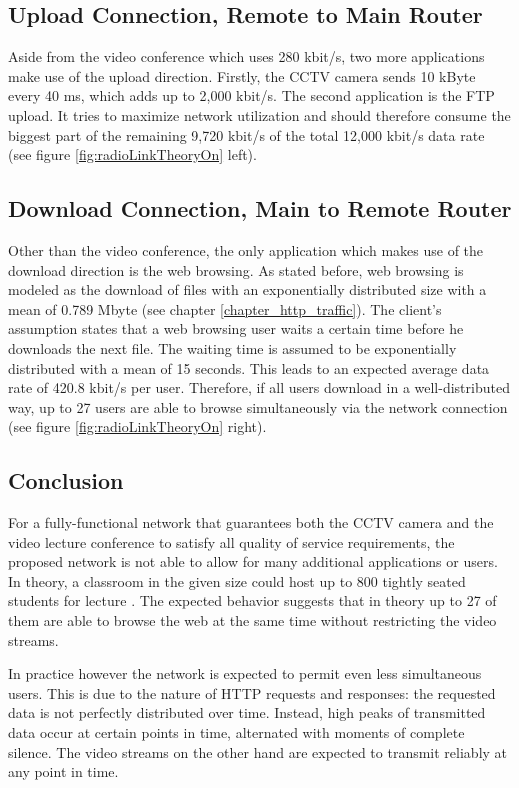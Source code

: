\documentclass[a4paper,10pt]{book}\usepackage{graphicx}
\begin{document}
\subsection{Upload Connection, Remote to Main Router}
Aside from the video conference which uses 280 kbit/s, two more applications make use of the upload direction. Firstly, the CCTV camera sends 10 kByte every 40 ms, which adds up to 2,000 kbit/s. The second application is the FTP upload. It tries to maximize network utilization and should therefore consume the biggest part of the remaining 9,720 kbit/s of the total 12,000 kbit/s data rate (see figure \ref{fig:radioLinkTheoryOn} left).

\subsection{Download Connection, Main to Remote Router}
Other than the video conference, the only application which makes use of the download direction is the web browsing. As stated before, web browsing is modeled as the download of files with an exponentially distributed size with a mean of 0.789 Mbyte (see chapter \ref{chapter_http_traffic}). The client's assumption states that a web browsing user waits a certain time before he downloads the next file. The waiting time is assumed to be exponentially distributed with a mean of 15 seconds. This leads to an expected average data rate of 420.8 kbit/s per user. Therefore, if all users download in a well-distributed way, up to 27 users are able to browse simultaneously via the network connection (see figure \ref{fig:radioLinkTheoryOn} right).

\subsection{Conclusion}
For a fully-functional network that guarantees both the CCTV camera and the video lecture conference to satisfy all quality of service requirements, the proposed network is not able to allow for many additional applications or users. In theory, a classroom in the given size could host up to 800 tightly seated students for lecture \cite{sitzkultur}. The expected behavior suggests that in theory up to 27 of them are able to browse the web at the same time without restricting the video streams. 

In practice however the network is expected to permit even less simultaneous users. This is due to the nature of HTTP requests and responses: the requested data is not perfectly distributed over time. Instead, high peaks of transmitted data occur at certain points in time, alternated with moments of complete silence. The video streams on the other hand are expected to transmit reliably at any point in time.
\end{document}
